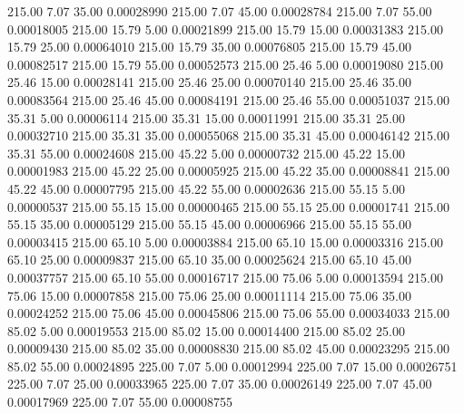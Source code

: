     215.00      7.07     35.00     0.00028990
    215.00      7.07     45.00     0.00028784
    215.00      7.07     55.00     0.00018005
    215.00     15.79      5.00     0.00021899
    215.00     15.79     15.00     0.00031383
    215.00     15.79     25.00     0.00064010
    215.00     15.79     35.00     0.00076805
    215.00     15.79     45.00     0.00082517
    215.00     15.79     55.00     0.00052573
    215.00     25.46      5.00     0.00019080
    215.00     25.46     15.00     0.00028141
    215.00     25.46     25.00     0.00070140
    215.00     25.46     35.00     0.00083564
    215.00     25.46     45.00     0.00084191
    215.00     25.46     55.00     0.00051037
    215.00     35.31      5.00     0.00006114
    215.00     35.31     15.00     0.00011991
    215.00     35.31     25.00     0.00032710
    215.00     35.31     35.00     0.00055068
    215.00     35.31     45.00     0.00046142
    215.00     35.31     55.00     0.00024608
    215.00     45.22      5.00     0.00000732
    215.00     45.22     15.00     0.00001983
    215.00     45.22     25.00     0.00005925
    215.00     45.22     35.00     0.00008841
    215.00     45.22     45.00     0.00007795
    215.00     45.22     55.00     0.00002636
    215.00     55.15      5.00     0.00000537
    215.00     55.15     15.00     0.00000465
    215.00     55.15     25.00     0.00001741
    215.00     55.15     35.00     0.00005129
    215.00     55.15     45.00     0.00006966
    215.00     55.15     55.00     0.00003415
    215.00     65.10      5.00     0.00003884
    215.00     65.10     15.00     0.00003316
    215.00     65.10     25.00     0.00009837
    215.00     65.10     35.00     0.00025624
    215.00     65.10     45.00     0.00037757
    215.00     65.10     55.00     0.00016717
    215.00     75.06      5.00     0.00013594
    215.00     75.06     15.00     0.00007858
    215.00     75.06     25.00     0.00011114
    215.00     75.06     35.00     0.00024252
    215.00     75.06     45.00     0.00045806
    215.00     75.06     55.00     0.00034033
    215.00     85.02      5.00     0.00019553
    215.00     85.02     15.00     0.00014400
    215.00     85.02     25.00     0.00009430
    215.00     85.02     35.00     0.00008830
    215.00     85.02     45.00     0.00023295
    215.00     85.02     55.00     0.00024895
    225.00      7.07      5.00     0.00012994
    225.00      7.07     15.00     0.00026751
    225.00      7.07     25.00     0.00033965
    225.00      7.07     35.00     0.00026149
    225.00      7.07     45.00     0.00017969
    225.00      7.07     55.00     0.00008755
